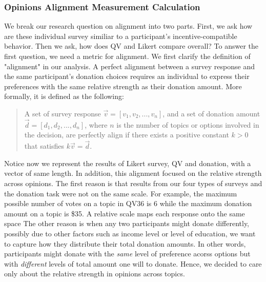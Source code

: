 \subsubsection{Opinions Alignment Measurement Calculation}
We break our research question on alignment
into two parts. 
First, we ask how are these individual survey 
similiar to a participant's incentive-compatible behavior.
Then we ask, how does QV and Likert compare overall?
To answer the first question, 
we need a metric for alignment.
We first clarify the definition of "alignment" in our analysis. 
A perfect alignment 
between a survey response 
and the same participant's donation choices
requires an individual to express their preferences
with the same relative strength as their donation amount. 
More formally, it is defined as the following:\par

\begin{quote}
    A set of survey response $\vec{v} = [v_1, v_2, ..., v_n]$, 
    and a set of donation amount $\vec{d} = [d_1, d_2, ..., d_n]$, 
    where $n$ is the number of topics or options involved in the decision, 
    are perfectly align if there exists a positive constant $k>0$ that satisfies $k\vec{v} = \vec{d}$.
\end{quote}

Notice now we represent
the results of Likert survey, QV and donation, 
with a vector of same length.
In addition,
this alignment focused on 
the relative strength across opinions. 
The first reason is that 
results from our four types of surveys 
and the donation task were not on the same scale. 
For example, the maximum possible number of votes on a topic 
in QV36 is 6 
while the maximum donation amount on a topic is \$35. 
A relative scale maps each response onto the same space
The other reason is when
any two participants might donate differently,
possibly due to other factors 
such as income level or level of education,
we want to capture 
how they distribute their total donation amounts.
In other words, 
participants might donate 
with the \textit{same} level of preference acorss options 
but with \textit{different} levels of total amount one will to donate.
Hence, we decided to 
care only about 
the relative strength in opinions across topics.

